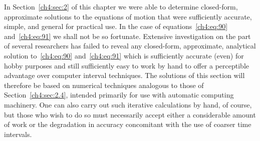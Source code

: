 In Section~\ref{ch4:sec:2} of this chapter we were able to determine closed-form, approximate
solutions to the equations of motion that were sufficiently accurate, simple, and general for
practical use. In the case of equations~\eqref{ch4:eq:90} and~\eqref{ch4:eq:91} we shall not be so
fortunate. Extensive investigation on the part of several researchers has failed to reveal any
closed-form, approximate, analytical solution to~\eqref{ch4:eq:90} and~\eqref{ch4:eq:91} which is
sufficiently accurate (even) for hobby purposes and still sufficiently easy to work by hand to
offer a perceptible advantage over computer interval techniques. The solutions of this section
will therefore be based on numerical techniques analogous to those of Section~\ref{ch4:sec:2.4},
intended primarily for use with automatic computing machinery. One can also carry out such
iterative calculations by hand, of course, but those who wish to do so must necessarily accept
either a considerable amount of work or the degradation in accuracy concomitant with the use of
coarser time intervals.

